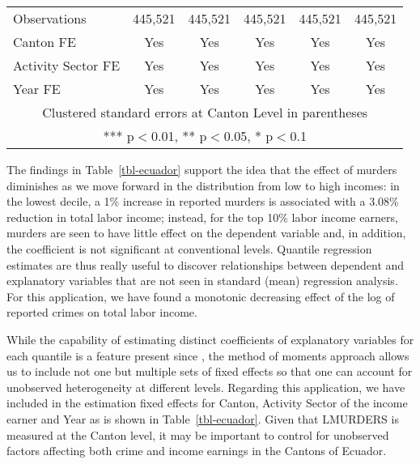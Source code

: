 \documentclass[
  12pt,
  oneside]{article}
\begin{document}
\begin{table}[htbp]
{\begin{tabular}{lccccc}
     &  &  &  &  &  \\
    \bottomrule
    Observations & 445,521 & 445,521 & 445,521 & 445,521 & 445,521 \\
    Canton FE & Yes & Yes & Yes & Yes & Yes \\
    Activity Sector FE & Yes & Yes & Yes & Yes & Yes \\
    Year FE & Yes & Yes & Yes & Yes & Yes \\ 
    \bottomrule
    \multicolumn{6}{c}{ Clustered standard errors at Canton Level in parentheses} \\
    \multicolumn{6}{c}{ *** p$<$0.01, ** p$<$0.05, * p$<$0.1} \\
    \end{tabular}
 
    

}

\end{table}%

The findings in Table~\ref{tbl-ecuador} support the idea that the effect
of murders diminishes as we move forward in the distribution from low to
high incomes: in the lowest decile, a 1\% increase in reported murders
is associated with a 3.08\% reduction in total labor income; instead,
for the top 10\% labor income earners, murders are seen to have little
effect on the dependent variable and, in addition, the coefficient is
not significant at conventional levels. Quantile regression estimates
are thus really useful to discover relationships between dependent and
explanatory variables that are not seen in standard (mean) regression
analysis. For this application, we have found a monotonic decreasing
effect of the log of reported crimes on total labor income.

While the capability of estimating distinct coefficients of explanatory
variables for each quantile is a feature present since
\citet{koenkerbasset1978}, the method of moments approach allows us to
include not one but multiple sets of fixed effects so that one can
account for unobserved heterogeneity at different levels. Regarding this
application, we have included in the estimation fixed effects for
Canton, Activity Sector of the income earner and Year as is shown in
Table~\ref{tbl-ecuador}. Given that LMURDERS is measured at the Canton
level, it may be important to control for unobserved factors affecting
both crime and income earnings in the Cantons of Ecuador.
\end{document}
